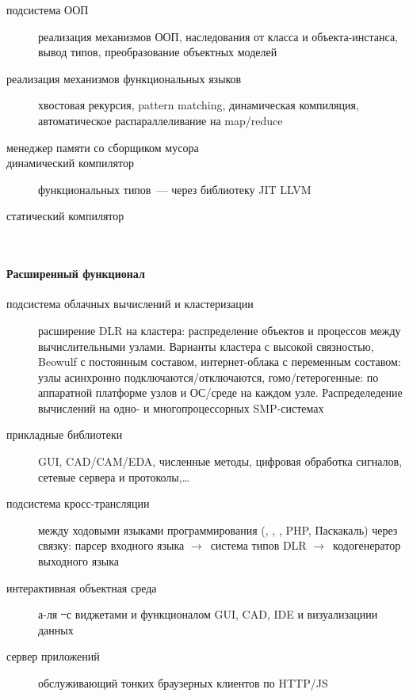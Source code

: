 \begin{description}
  \item[подсистема ООП] реализация механизмов ООП, наследования от класса и
  объекта-инстанса, вывод типов, преобразование объектных моделей
  \item[реализация механизмов функциональных языков] хвостовая рекурсия, pattern
  matching, динамическая компиляция, автоматическое распараллеливание на
  map/reduce
  \item[менеджер памяти со сборщиком мусора]
  \item[динамический компилятор] функциональных типов\ --- через библиотеку JIT
  LLVM
  \item[статический компилятор] \ \\
\end{description}

\paragraph{Расширенный функционал}

\begin{description}
  \item[подсистема облачных вычислений и кластеризации] расширение DLR на
  кластера: распределение объектов и процессов между вычислительными узлами.
  Варианты кластера с высокой связностью, Beowulf с
  постоянным составом, интернет-облака с переменным составом: узлы асинхронно
  подключаются/отключаются, гомо/гетерогенные: по аппаратной платформе узлов и
  ОС/среде на каждом узле. Распределедение вычислений на одно- и
  многопроцессорных SMP-системах
  \item[прикладные библиотеки] GUI, CAD/CAM/EDA, численные методы, цифровая
  обработка сигналов, сетевые сервера и протоколы,\ldots
  \item[подсистема кросс-трансляции] между ходовыми языками программирования
  (\cpp, \js, \py, PHP, Паскакаль) через связку: парсер входного
  языка $\rightarrow$\ система типов DLR $\rightarrow$\ кодогенератор выходного
  языка
  \item[интерактивная объектная среда] а-ля \st\ с виджетами и функционалом GUI,
  CAD, IDE и визуализациии данных
  \item[сервер приложений] обслуживающий тонких браузерных клиентов по HTTP/JS
\end{description}



